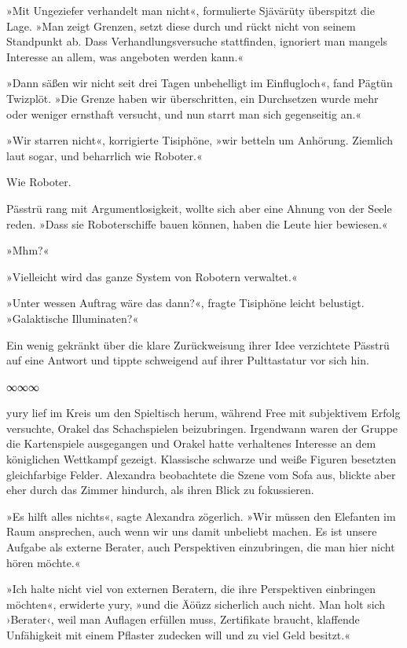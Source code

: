 »Mit Ungeziefer verhandelt man nicht«, formulierte Sjävärüty überspitzt die Lage. »Man zeigt Grenzen, setzt diese durch und rückt nicht von seinem Standpunkt ab. Dass Verhandlungsversuche stattfinden, ignoriert man mangels Interesse an allem, was angeboten werden kann.«

»Dann säßen wir nicht seit drei Tagen unbehelligt im Einflugloch«, fand Pägtün Twizplöt. »Die Grenze haben wir überschritten, ein Durchsetzen wurde mehr oder weniger ernsthaft versucht, und nun starrt man sich gegenseitig an.«

»Wir starren nicht«, korrigierte Tisiphöne, »wir betteln um Anhörung. Ziemlich laut sogar, und beharrlich wie Roboter.«

Wie Roboter.

Pässtrü rang mit Argumentlosigkeit, wollte sich aber eine Ahnung von der Seele reden. »Dass sie Roboterschiffe bauen können, haben die Leute hier bewiesen.«

»Mhm?«

»Vielleicht wird das ganze System von Robotern verwaltet.«

»Unter wessen Auftrag wäre das dann?«, fragte Tisiphöne leicht belustigt. »Galaktische Illuminaten?«

Ein wenig gekränkt über die klare Zurückweisung ihrer Idee verzichtete Pässtrü auf eine Antwort und tippte schweigend auf ihrer Pulttastatur vor sich hin.

\begin{center}
∞∞∞
\end{center}

yury lief im Kreis um den Spieltisch herum, während Free mit subjektivem Erfolg versuchte, Orakel das Schachspielen beizubringen. Irgendwann waren der Gruppe die Kartenspiele ausgegangen und Orakel hatte verhaltenes Interesse an dem königlichen Wettkampf gezeigt. Klassische schwarze und weiße Figuren besetzten gleichfarbige Felder. Alexandra beobachtete die Szene vom Sofa aus, blickte aber eher durch das Zimmer hindurch, als ihren Blick zu fokussieren.

»Es hilft alles nichts«, sagte Alexandra zögerlich. »Wir müssen den Elefanten im Raum ansprechen, auch wenn wir uns damit unbeliebt machen. Es ist unsere Aufgabe als externe Berater, auch Perspektiven einzubringen, die man hier nicht hören möchte.«

»Ich halte nicht viel von externen Beratern, die ihre Perspektiven einbringen möchten«, erwiderte yury, »und die Äöüzz sicherlich auch nicht. Man holt sich ›Berater‹, weil man Auflagen erfüllen muss, Zertifikate braucht, klaffende Unfähigkeit mit einem Pflaster zudecken will und zu viel Geld besitzt.«

